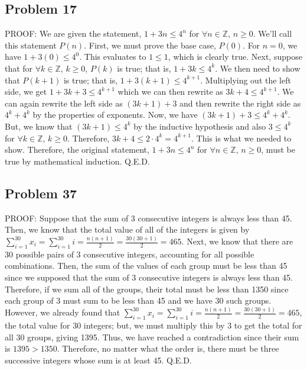 \documentclass{article}
\begin{document}
\subsection*{Problem 17}

PROOF: We are given the statement, $1 + 3n \leq 4^n$ for $\forall n \in \mathbb{Z}$, $n \geq 0$. We'll call this statement $P(n)$. First, we must prove the base case, $P(0)$. For $n=0$, we have $1 + 3(0) \leq 4^{0}$. This evaluates to $1 \leq 1$, which is clearly true. Next, suppose that for $\forall k \in \mathbb{Z}$, $k \geq 0$, $P(k)$ is true; that is, $1 + 3k \leq 4^k$. We then need to show that $P(k+1)$ is true; that is, $1 + 3(k+1) \leq 4^{k+1}$. Multiplying out the left side, we get $1 + 3k+3 \leq 4^{k+1}$ which we can then rewrite as $3k + 4 \leq 4^{k+1}$. We can again rewrite the left side as $(3k + 1) + 3$ and then rewrite the right side as $4^{k} + 4^{k}$ by the properties of exponents. Now, we have $(3k + 1) + 3 \leq 4^{k} + 4^{k}$. But, we know that $(3k + 1) \leq 4^{k}$ by the inductive hypothesis and also $3 \leq 4^{k}$ for $\forall k \in \mathbb{Z}$, $k \geq 0$. Therefore, $3k + 4 \leq 2\cdot 4^{k} = 4^{k+1}$. This is what we needed to show. Therefore, the original statement, $1 + 3n \leq 4^n$ for $\forall n \in \mathbb{Z}$, $n \geq 0$, must be true by mathematical induction. Q.E.D.

\subsection*{Problem 37}

PROOF: Suppose that the sum of 3 consecutive integers is always less than 45. Then, we know that the total value of all of the integers is given by $\sum\limits_{i=1}^{30} x_{i} = \sum\limits_{i=1}^{30} i = \frac{n(n+1)}{2} = \frac{30(30+1)}{2} = 465$. Next, we know that there are 30 possible pairs of 3 consecutive integers, accounting for all possible combinations. Then, the sum of the values of each group must be less than 45 since we supposed that the sum of 3 consecutive integers is always less than 45. Therefore, if we sum all of the groups, their total must be less than 1350 since each group of 3 must sum to be less than 45 and we have 30 such groups. However, we already found that $\sum\limits_{i=1}^{30} x_{i} = \sum\limits_{i=1}^{30} i = \frac{n(n+1)}{2} = \frac{30(30+1)}{2} = 465$, the total value for 30 integers; but, we must multiply this by 3 to get the total for all 30 groups, giving 1395. Thus, we have reached a contradiction since their sum is $1395 > 1350$. Therefore, no matter what the order is, there must be three successive integers whose sum is at least 45. Q.E.D.
\end{document}
